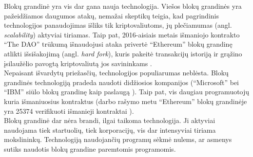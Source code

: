 Blokų grandinė yra vis dar gana nauja technologija. Viešos blokų grandinės yra pažeidžiamos daugumos atakų, nemažai skeptikų
teigia, kad pagrindinis technologijos panaudojimas išliks tik kriptovaliutoms, jų plečiamumas (angl. \textit{scalability}) aktyviai
tiriamas. Taip pat, 2016-aisiais metais išmaniojo kontrakto \enquote{The DAO} trūkumą išnaudojusi ataka privertė \enquote{Ethereum} 
blokų grandinę atlikti išsišakojimą (angl. \textit{hard fork}), kuris pakeitė transakcijų istoriją ir grąžino įsilaužėlio
pavogtą kriptovaliutą jos savininkams \cite{TheDAO}.\\
Nepaisant išvardytų priežasčių, technologijos populiarumas neblėsta. Blokų grandinės technologiją pradeda naudoti didžiosios kompanijos
(\enquote{Microsoft} bei \enquote{IBM} siūlo
blokų grandinę kaip paslaugą \cite{Zheng2017}). Taip pat, vis daugiau programuotojų kuria išmaniuosius kontraktus
(darbo rašymo metu \enquote{Ethereum} blokų grandinėje yra 25374 verifikuoti išmanieji kontraktai \cite{EthVerifiedContracts}).\\
Blokų grandinė dar nėra brandi, ilgai taikoma technologija. Ji aktyviai naudojama tiek startuolių, tiek
korporacijų, vis dar intensyviai tiriama mokslininkų. Technologiją naudojančių programų sėkmė nulems, ar asmenys
sutiks naudotis blokų grandine paremtomis programomis.




